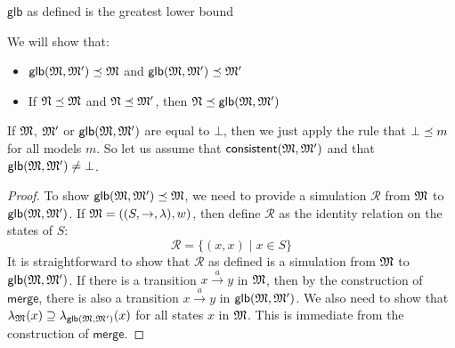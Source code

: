 \begin{lemma}
$\mathsf{glb}$ as defined is the greatest lower bound
\end{lemma}
We will show that:
\begin{itemize}
\item
$\mathsf{glb}(\frak{M}, \frak{M}') \preceq \frak{M}$ and $\mathsf{glb}(\frak{M}, \frak{M}') \preceq \frak{M}'$
\item
If $\frak{N} \preceq \frak{M}$ and $\frak{N} \preceq \frak{M}'$, then $\frak{N} \preceq \mathsf{glb}(\frak{M}, \frak{M}')$
\end{itemize}
If $\frak{M}$, $ \frak{M}'$ or $\mathsf{glb}(\frak{M}, \frak{M}')$ are equal to $\bot$, then we just apply the rule that $\bot \preceq m$ for all models $m$. 
So let us assume that $\mathsf{consistent}(\frak{M}, \frak{M}')$ and that $\mathsf{glb}(\frak{M}, \frak{M}')  \neq \bot$.

\begin{proof}
To show $\mathsf{glb}(\frak{M}, \frak{M}') \preceq \frak{M}$, we need to provide a simulation $\mathcal{R}$ from $\frak{M}$ to  $\mathsf{glb}(\frak{M}, \frak{M}')$.
If $\frak{M} = ((S,\rightarrow,\lambda),w)$, then define $\mathcal{R}$ as the identity relation on the states of $S$:
\[
\mathcal{R} = \{(x,x) \; | \; x \in S\}
\]
It is straightforward to show that $\mathcal{R}$ as defined is a simulation from $\frak{M}$ to  $\mathsf{glb}(\frak{M}, \frak{M}')$.
If there is a transition $x \xrightarrow{a} y$ in $\frak{M}$, then by the construction of $\mathsf{merge}$, there is also a transition $x \xrightarrow{a} y$ in $\mathsf{glb}(\frak{M}, \frak{M}')$.
We also need to show that $\lambda_{\frak{M}}(x) \supseteq \lambda_{\mathsf{glb}(\frak{M}, \frak{M}')}(x)$ for all states $x$ in $\frak{M}$. This is immediate from the construction of $\mathsf{merge}$.

\end{proof}


